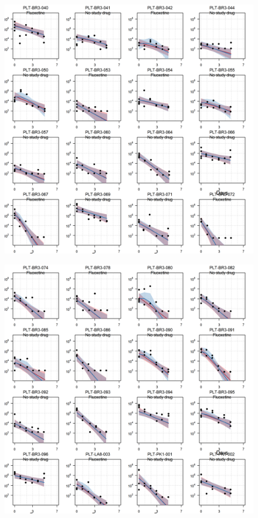 \documentclass[
  letterpaper,
  DIV=11,
  numbers=noendperiod]{scrartcl}
\begin{document}
\begin{figure}[H]

{\centering \includegraphics{Fluoxetine_analysis_files/figure-pdf/individ_data-1.png}

}

\end{figure}

\begin{figure}[H]

{\centering \includegraphics{Fluoxetine_analysis_files/figure-pdf/individ_data-2.png}

}

\end{figure}
\end{document}
